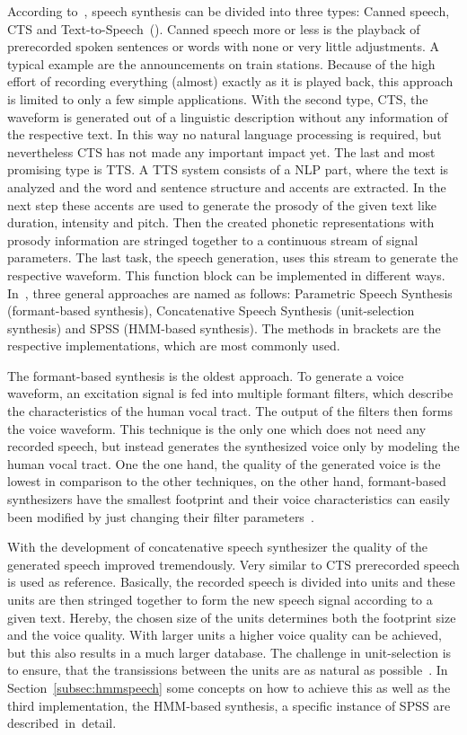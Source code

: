 According to~\cite{hinterleitner:quality}, speech synthesis can be divided into three types: Canned speech, \ac{CTS} and Text-to-\break Speech~(). Canned speech more or less is the playback of prerecorded spoken sentences or words with none or very little adjustments. A typical example are the announcements on train stations. Because of the high effort of recording everything (almost) exactly as it is played back, this approach is limited to only a few simple applications. With the second type, \ac{CTS}, the waveform is generated out of a linguistic description without any information of the respective text. In this way no natural language processing is required, but nevertheless \ac{CTS} has not made any important impact yet. The last and most promising type is \ac{TTS}. A \ac{TTS} system consists of a \ac{NLP} part, where the text is analyzed and the word and sentence structure and accents are extracted. In the next step these accents are used to generate the prosody of the given text like duration, intensity and pitch. Then the created phonetic representations with prosody information are stringed together to a continuous stream of signal parameters. The last task, the speech generation, uses this stream to generate the respective waveform. This function block can be implemented in different ways. In~\cite{hinterleitner:quality}, three general approaches are named as follows: Parametric Speech Synthesis (formant-based synthesis), Concatenative Speech Synthesis (unit-selection synthesis) and \acf{SPSS} (\acf{HMM}-based synthesis). The methods in brackets are the respective implementations, which are most commonly used. 

The formant-based synthesis is the oldest approach. To generate a voice waveform, an excitation signal is fed into multiple formant filters, which describe the characteristics of the human vocal tract. The output of the filters then forms the voice waveform. This technique is the only one which does not need any recorded speech, but instead generates the synthesized voice only by modeling the human vocal tract. One the one hand, the quality of the generated voice is the lowest in comparison to the other techniques, on the other hand, formant-based synthesizers have the smallest footprint and their voice characteristics can easily been modified by just changing their filter parameters~\cite{hinterleitner:quality}.

With the development of concatenative speech synthesizer the quality of the generated speech improved tremendously. Very similar to \ac{CTS} prerecorded speech is used as reference. Basically, the recorded speech is divided into units and these units are then stringed together to form the new speech signal according to a given text. Hereby, the chosen size of the units determines both the footprint size and the voice quality. With larger units a higher voice quality can be achieved, but this also results in a much larger database. The challenge in unit-selection is to ensure, that the transissions between the units are as natural as possible~\cite{hinterleitner:quality}. In Section~\ref{subsec:hmmspeech} some concepts on how to achieve this as well as the third implementation, the \ac{HMM}-based synthesis, a specific instance of \ac{SPSS} are described~in~detail.

